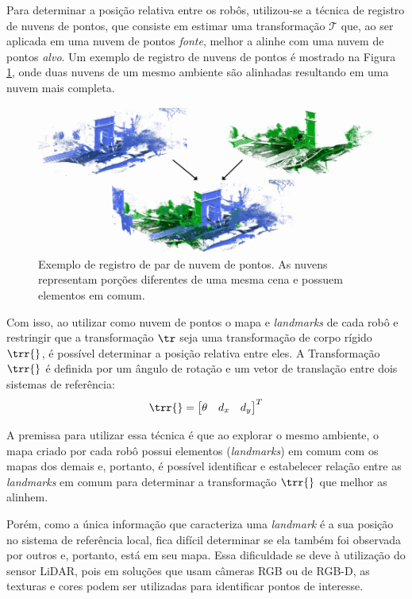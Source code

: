 Para determinar a posição relativa entre os robôs, utilizou-se a técnica 
de registro de nuvens de pontos, que consiste em estimar uma 
transformação $\mathcal{T}$ que, ao ser aplicada em uma nuvem de pontos 
\emph{fonte}, melhor a alinhe com uma nuvem de pontos \emph{alvo}. Um 
exemplo de registro de nuvens de pontos é mostrado na Figura 
\ref{fig:point-cloud-registration-example}, onde duas nuvens de um mesmo 
ambiente são alinhadas resultando em uma nuvem mais completa.

\begin{figure}[h]
  \centering
  \includegraphics[width=.7\textwidth]{figs/point-cloud-registration-example.png}
  \caption{Exemplo de registro de par de nuvem de pontos. As nuvens representam porções diferentes de uma mesma cena e possuem elementos 
  em comum.}
  \label{fig:point-cloud-registration-example}
\end{figure}

Com isso, ao utilizar como nuvem de pontos o mapa 
e \textit{landmarks} de cada robô e restringir que a transformação $\tr$ seja uma transformação de corpo rígido $\trr{}$, é possível determinar 
a posição 
relativa entre eles. A Transformação $\trr{}$ é definida por um ângulo
de rotação e um vetor de translação entre dois sistemas de referência:
\begin{equation}
  \trr{} = \begin{bmatrix}
    \theta & d_x & d_y 
  \end{bmatrix}^T
  \label{eq:rigid-transform}
\end{equation}

A premissa para utilizar essa técnica é que ao 
explorar o mesmo ambiente, o mapa criado por cada robô possui 
elementos (\textit{landmarks}) em comum com 
os mapas dos demais e, portanto, é possível identificar e estabelecer 
relação entre as \textit{landmarks} em comum para determinar a 
transformação $\trr{}$ que melhor as alinhem.

Porém, como a única informação que caracteriza uma \textit{landmark} é a 
sua posição no sistema de referência local, fica difícil determinar se 
ela também foi observada por outros e, portanto, está em seu mapa. Essa 
dificuldade se deve à utilização do sensor LiDAR, pois em soluções que usam 
câmeras RGB ou de RGB-D, as texturas e cores podem ser utilizadas para 
identificar pontos de interesse.

